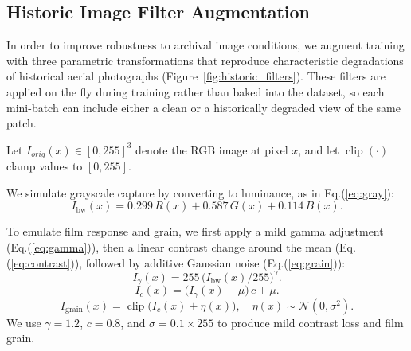 \documentclass[journal]{IEEEtran}
\newcommand{\eqnref}[1]{Eq.(\ref{#1})}
\begin{document}
\subsection{Historic Image Filter Augmentation}
\label{subsec:historic_filters}

In order to improve robustness to archival image conditions, we augment training with three parametric transformations that reproduce characteristic degradations of historical aerial photographs (Figure~\ref{fig:historic_filters}). These filters are applied on the fly during training rather than baked into the dataset, so each mini-batch can include either a clean or a historically degraded view of the same patch.

Let $I_{orig}(x)\in[0,255]^3$ denote the RGB image at pixel $x$, and let $\operatorname{clip}(\cdot)$ clamp values to $[0,255]$.

We simulate grayscale capture by converting to luminance, as in \eqnref{eq:gray}:
\begin{equation}
I_{\text{bw}}(x) = 0.299\,R(x) + 0.587\,G(x) + 0.114\,B(x).
\label{eq:gray}
\end{equation}

To emulate film response and grain, we first apply a mild gamma adjustment (\eqnref{eq:gamma}), then a linear contrast change around the mean (\eqnref{eq:contrast}), followed by additive Gaussian noise (\eqnref{eq:grain}):
\begin{equation}
I_{\gamma}(x) = 255\,\big(I_{\text{bw}}(x)/255\big)^{\gamma}.
\label{eq:gamma}
\end{equation}
\begin{equation}
I_{c}(x) = \big(I_{\gamma}(x) - \mu\big)\,c + \mu.
\label{eq:contrast}
\end{equation}
\begin{equation}
I_{\text{grain}}(x) = \operatorname{clip}\big(I_{c}(x) + \eta(x)\big),\quad \eta(x)\sim\mathcal{N}(0,\sigma^2).
\label{eq:grain}
\end{equation}
We use $\gamma=1.2$, $c=0.8$, and $\sigma=0.1\times 255$ to produce mild contrast loss and film grain.
\end{document}
